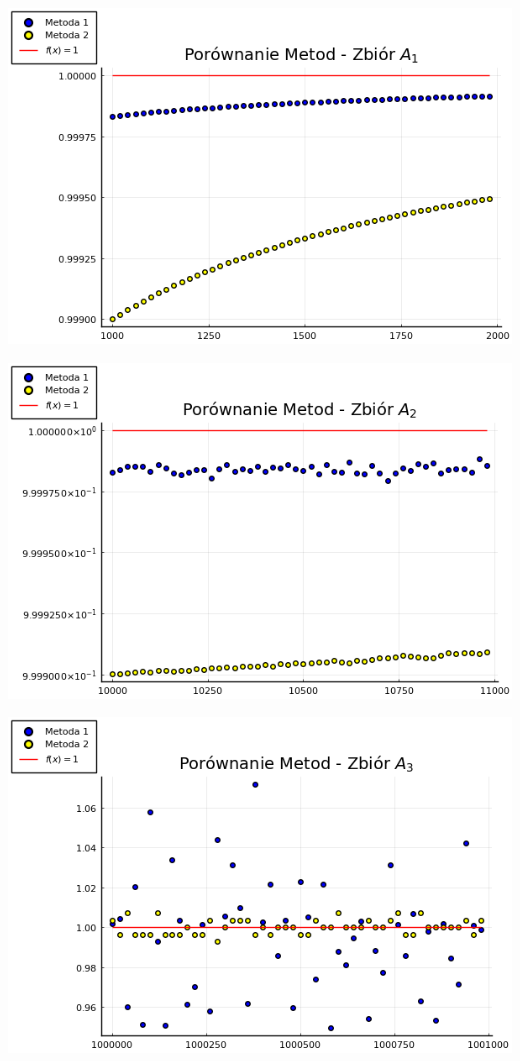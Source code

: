 \documentclass[11pt,wide]{mwart}
\begin{document}
\vspace{1cm}
\centerline{\includegraphics[scale=0.8]{chart3_1}}
\vspace{1cm}
\centerline{\includegraphics[scale=0.8]{chart3_2}}
\vspace{1cm}
\centerline{\includegraphics[scale=0.8]{chart3_3}}
\vspace{1cm}
\end{document}
